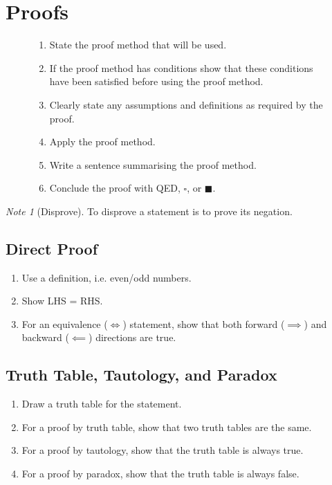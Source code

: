 \documentclass{article}
\theoremstyle{plain}
\numberwithin{theorem}{subsection}
\theoremstyle{definition}
\numberwithin{definition}{subsection}
\theoremstyle{remark}
\newtheorem{note}{Note}[section]
\numberwithin{note}{subsection}
\begin{document}
\section{Proofs}
\begin{figure}[H]
    \begin{mdframed}[style=exampledefault,frametitle={Proof Structure}]
        \begin{enumerate}[leftmargin=3.5em, itemsep=0.2em, topsep=0.35em]
            \item State the proof method that will be used.
            \item If the proof method has conditions show that these conditions have been satisfied before using the proof method.
            \item Clearly state any assumptions and definitions as required by the proof.
            \item Apply the proof method.
            \item Write a sentence summarising the proof method.
            \item Conclude the proof with QED, $\square$, or $\blacksquare$.
        \end{enumerate}
    \end{mdframed}
\end{figure}
%
\begin{note}[Disprove]
    To disprove a statement is to prove its negation.
\end{note}
%
\subsection{Direct Proof}
\begin{enumerate}
    \item Use a definition, i.e. even/odd numbers.
    \item Show LHS = RHS.
    \item For an equivalence ($\iff$) statement, show that both forward ($\implies$) and backward ($\impliedby$) directions are true.
\end{enumerate}
%
\subsection{Truth Table, Tautology, and Paradox}
\begin{enumerate}
    \item Draw a truth table for the statement.
    \item For a proof by truth table, show that two truth tables are the same.
    \item For a proof by tautology, show that the truth table is always true.
    \item For a proof by paradox, show that the truth table is always false.
\end{enumerate}
%
\end{document}
